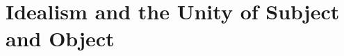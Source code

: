 \documentclass{article}
\begin{document}
    




\section{Idealism and the Unity of Subject and Object}
\end{document}
